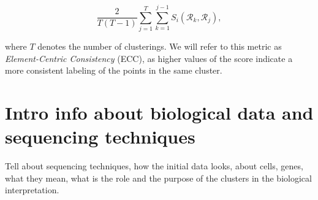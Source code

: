     \[ \frac{2}{T(T-1)} \sum_{j=1}^T \sum_{k=1}^{j-1} S_i (\mathcal{R}_k, \mathcal{R}_j), \]

    where $T$ denotes the number of clusterings. We will refer to this metric as \textit{Element-Centric Consistency} (ECC), as higher values of the score indicate a more consistent labeling of the points in the same cluster.
    

\section{Intro info about biological data and sequencing techniques}
Tell about sequencing techniques, how the initial data looks, about cells, genes, what they mean, what is the role and the purpose of the clusters in the biological interpretation.
